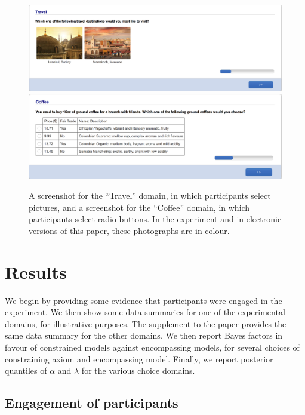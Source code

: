 \documentclass[11pt,letter]{article}
\begin{document}
\begin{figure}
	\begin{center}
	\includegraphics[width=15cm]{Population_study_design/screenshot_Travel.png}
	\includegraphics[width=15cm]{Population_study_design/screenshot_Coffee.png}
	\caption{A screenshot for the ``Travel'' domain, in which participants select pictures, and a screenshot for the ``Coffee'' domain, in which participants select radio buttons. In the experiment and in electronic versions of this paper, these photographs are in colour.}\label{f:screenshots}
	\end{center}
\end{figure}

\section{Results}\label{s:results}

We begin by providing some evidence that participants were engaged in the experiment.
We then show some data summaries for one of the experimental domains, for illustrative purposes.
The supplement to the paper provides the same data summary for the other domains.
We then report Bayes factors in favour of constrained models against encompassing models, for several choices of constraining axiom and encompassing model.
Finally, we report posterior quantiles of $\alpha$ and $\lambda$ for the various choice domains.

\subsection{Engagement of participants}
\end{document}

